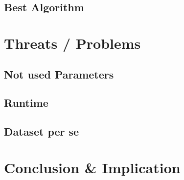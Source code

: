 \documentclass[a4paper,11pt]{article}
\begin{document}
\subsection{Best Algorithm}

\section{Threats / Problems}

\subsection{Not used Parameters}
\subsection{Runtime}
\subsection{Dataset per se}

\section{Conclusion \& Implication}	




\end{document}
